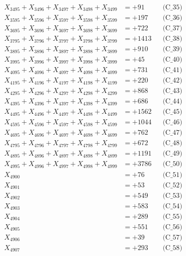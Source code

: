 \documentclass[a4paper,10pt]{article}
\begin{document}
{\begin{align}
X_{3495} + X_{3496} + X_{3497} + X_{3498} + X_{3499} &= +91 && \text{(C\_35)} \\
\allowbreak
X_{3595} + X_{3596} + X_{3597} + X_{3598} + X_{3599} &= +197 && \text{(C\_36)} \\
X_{3695} + X_{3696} + X_{3697} + X_{3698} + X_{3699} &= +722 && \text{(C\_37)} \\
X_{3795} + X_{3796} + X_{3797} + X_{3798} + X_{3799} &= +1413 && \text{(C\_38)} \\
X_{3895} + X_{3896} + X_{3897} + X_{3898} + X_{3899} &= +910 && \text{(C\_39)} \\
X_{3995} + X_{3996} + X_{3997} + X_{3998} + X_{3999} &= +45 && \text{(C\_40)} \\
\allowbreak
X_{4095} + X_{4096} + X_{4097} + X_{4098} + X_{4099} &= +731 && \text{(C\_41)} \\
X_{4195} + X_{4196} + X_{4197} + X_{4198} + X_{4199} &= +220 && \text{(C\_42)} \\
X_{4295} + X_{4296} + X_{4297} + X_{4298} + X_{4299} &= +868 && \text{(C\_43)} \\
X_{4395} + X_{4396} + X_{4397} + X_{4398} + X_{4399} &= +686 && \text{(C\_44)} \\
X_{4495} + X_{4496} + X_{4497} + X_{4498} + X_{4499} &= +1562 && \text{(C\_45)} \\
\allowbreak
X_{4595} + X_{4596} + X_{4597} + X_{4598} + X_{4599} &= +1044 && \text{(C\_46)} \\
X_{4695} + X_{4696} + X_{4697} + X_{4698} + X_{4699} &= +762 && \text{(C\_47)} \\
X_{4795} + X_{4796} + X_{4797} + X_{4798} + X_{4799} &= +672 && \text{(C\_48)} \\
X_{4895} + X_{4896} + X_{4897} + X_{4898} + X_{4899} &= +1191 && \text{(C\_49)} \\
X_{4995} + X_{4996} + X_{4997} + X_{4998} + X_{4999} &= +3786 && \text{(C\_50)} \\
\allowbreak
X_{4900} &= +76 && \text{(C\_51)} \\
X_{4901} &= +53 && \text{(C\_52)} \\
X_{4902} &= +549 && \text{(C\_53)} \\
X_{4903} &= +583 && \text{(C\_54)} \\
X_{4904} &= +289 && \text{(C\_55)} \\
\allowbreak
X_{4905} &= +551 && \text{(C\_56)} \\
X_{4906} &= +39 && \text{(C\_57)} \\
X_{4907} &= +293 && \text{(C\_58)} \\

\end{align}}
\end{document}
